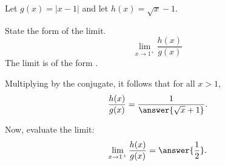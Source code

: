 \documentclass{ximera}
\begin{document}
\begin{exercise}
Let $g(x)=|x-1|$ and let $h(x)=\sqrt{x}-1$. 

\begin{exercise}
State the form of the limit.
\[
\lim_{x\to 1^{+}}\frac{h(x)}{g(x)}
\]
The limit  is of the form .
\begin{exercise}
Multiplying by the conjugate, it follows that for all $x>1$,  
\[
\frac{h(x)}{g(x)}=\frac{1}{\answer{\sqrt{x}+1}}.
\]
\begin{exercise}
Now, evaluate the limit:
\[
\lim_{x\to 1^+}\frac{h(x)}{g(x)}=\answer{\frac{1}{2}}.
\]
\end{exercise}
\end{exercise}
\end{exercise}
\end{exercise}
\end{document}
